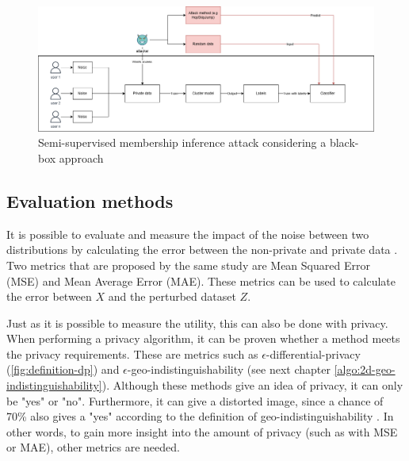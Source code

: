 


\begin{figure}
  \label{fig:unsupervised-mia-attack}
  \includegraphics[width=1.0\textwidth]{TheorethicalFramework/Differential privacy/master-thesis-MIA.png}
  \caption{Semi-supervised membership inference attack considering a black-box approach \citep{chen_hopskipjumpattack_2020,li_membership_2021}}
\end{figure}

\subsection{Evaluation methods} \label{theory:evaluation-dp}
It is possible to evaluate and measure the impact of the noise between two distributions by calculating the error between the non-private and private data \citep{del_rey_comprehensive_2020-1}.
Two metrics that are proposed by the same study are Mean Squared Error (MSE) and Mean Average Error (MAE).
These metrics can be used to calculate the error between $X$ and the perturbed dataset $Z$. \newline

Just as it is possible to measure the utility, this can also be done with privacy.
When performing a privacy algorithm, it can be proven whether a method meets the privacy requirements.
These are metrics such as $\epsilon$-differential-privacy (\ref{fig:definition-dp}) and $\epsilon$-geo-indistinguishability (see next chapter \ref{algo:2d-geo-indistinguishability}).
Although these methods give an idea of privacy, it can only be "yes" or "no".
Furthermore, it can give a distorted image, since a chance of 70\% also gives a "yes" according to the definition of geo-indistinguishability \citep{oya_is_2017}.
In other words, to gain more insight into the amount of privacy (such as with MSE or MAE), other metrics are needed.

